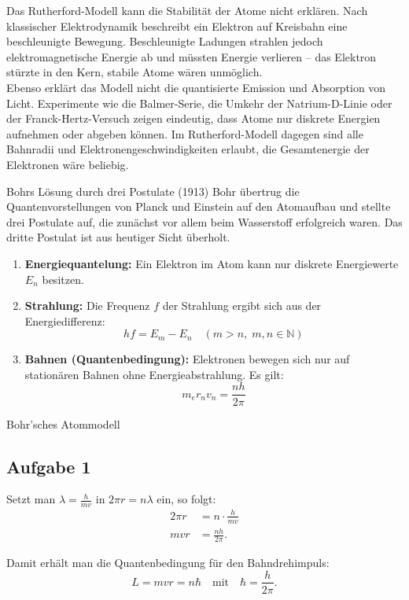 \documentclass[11pt,a4paper,oneside]{article}
\begin{document}
	Das Rutherford-Modell kann die Stabilität der Atome nicht erklären. 
	Nach klassischer Elektrodynamik beschreibt ein Elektron auf Kreisbahn 
	eine beschleunigte Bewegung. Beschleunigte Ladungen strahlen jedoch 
	elektromagnetische Energie ab und müssten Energie verlieren – 
	das Elektron stürzte in den Kern, stabile Atome wären unmöglich. \\
	
	Ebenso erklärt das Modell nicht die quantisierte Emission und Absorption 
	von Licht. Experimente wie die Balmer-Serie, die Umkehr der Natrium-D-Linie 
	oder der Franck-Hertz-Versuch zeigen eindeutig, dass Atome nur diskrete 
	Energien aufnehmen oder abgeben können. Im Rutherford-Modell dagegen 
	sind alle Bahnradii und Elektronengeschwindigkeiten erlaubt, 
	die Gesamtenergie der Elektronen wäre beliebig.
	
	\begin{theo}{Bohrs Lösung durch drei Postulate (1913)}
		Bohr übertrug die Quantenvorstellungen von Planck und Einstein 
		auf den Atomaufbau und stellte drei Postulate auf, 
		die zunächst vor allem beim Wasserstoff erfolgreich waren. 
		Das dritte Postulat ist aus heutiger Sicht überholt.
		
		\begin{enumerate}
			\item \textbf{Energiequantelung:} 
			Ein Elektron im Atom kann nur diskrete Energiewerte $E_n$ besitzen.
			
			\item \textbf{Strahlung:} 
			Die Frequenz $f$ der Strahlung ergibt sich aus der Energiedifferenz:
			\[
			h f = E_m - E_n \quad (m > n, \; m,n \in \mathbb{N})
			\]
			
			\item \textbf{Bahnen (Quantenbedingung):} 
			Elektronen bewegen sich nur auf stationären Bahnen ohne Energieabstrahlung. 
			Es gilt:
			\[
			m_e r_n v_n = \frac{n h}{2 \pi}
			\]
		\end{enumerate}
	\end{theo}
	
	\begin{loesung}{Bohr'sches Atommodell}
		\subsection*{Aufgabe 1}		
		Setzt man $\lambda = \tfrac{h}{mv}$ in $2 \pi r = n \lambda$ ein, so folgt:
		\begin{align*}
			2 \pi r &= n \cdot \frac{h}{m v} \\
			m v r &= \frac{n h}{2 \pi}.
		\end{align*}
		
		Damit erhält man die Quantenbedingung für den Bahndrehimpuls:
		\[
		L = m v r = n \hbar \quad \text{mit} \quad \hbar = \frac{h}{2 \pi}.
		\]
	\end{loesung}
	
\end{document}
